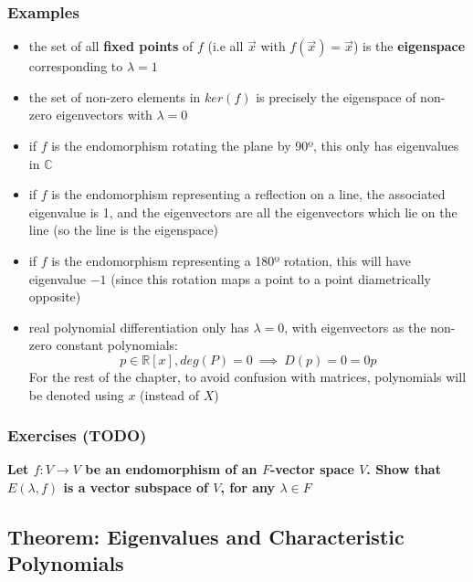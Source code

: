 \documentclass{exam}
\begin{document}
\subsubsection{Examples}

\begin{itemize}
    \item the set of all \textbf{fixed points} of $f$ (i.e all $\vec{x}$ with $f(\vec{x}) = \vec{x}$) is the \textbf{eigenspace} corresponding to $\lambda = 1$
    \item the set of non-zero elements in $ker(f)$ is precisely the eigenspace of non-zero eigenvectors with $\lambda = 0$
    \item if $f$ is the endomorphism rotating the plane by 90º, this only has eigenvalues in $\mathbb{C}$
    \item if $f$ is the endomorphism representing a reflection on a line, the associated eigenvalue is 1, and the eigenvectors are all the eigenvectors which lie on the line (so the line is the eigenspace)
    \item if $f$ is the endomorphism representing a 180º rotation, this will have eigenvalue $-1$ (since this rotation maps a point to a point diametrically opposite)
    \item real polynomial differentiation only has $\lambda = 0$, with eigenvectors as the non-zero constant polynomials:
    \[
    p \in \mathbb{R}[x], deg(P) = 0 \ \implies \ D(p) = 0 = 0p
    \]
    For the rest of the chapter, to avoid confusion with matrices, polynomials will be denoted using $x$ (instead of $X$)
\end{itemize}

\subsubsection{Exercises (TODO)}

\begin{questions}
    \question \textbf{Let $f : V \to V$ be an endomorphism of an $F$-vector space $V$. Show that $E(\lambda, f)$ is a vector subspace of $V$, for any $\lambda \in F$}
\end{questions}

\subsection{Theorem: Eigenvalues and Characteristic Polynomials}
\end{document}
